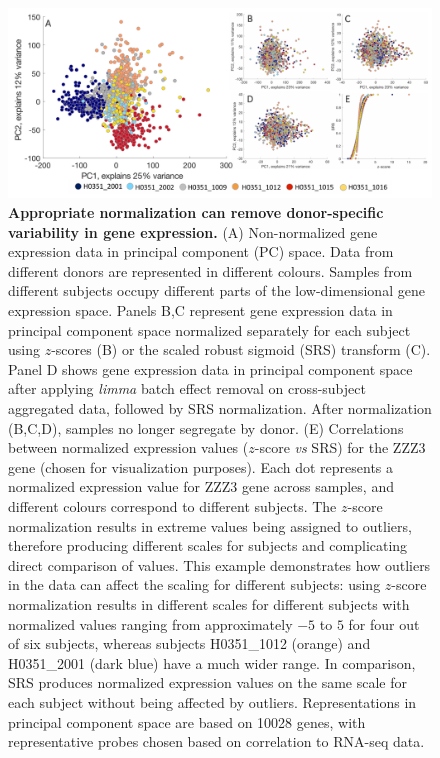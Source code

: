 \begin{figure}[h!]
  \centering
    \includegraphics[width=1\textwidth]{Chapter4/Ch4Fig6.pdf}
\caption{\textbf{Appropriate normalization can remove donor-specific variability in gene expression.}
(A) Non-normalized gene expression data in principal component (PC) space. Data from different donors are represented in different colours. Samples from different subjects occupy different parts of the low-dimensional gene expression space. Panels B,C represent gene expression data in principal component space normalized separately for each subject using $z$-scores
(B) or the scaled robust sigmoid (SRS) transform 
(C). Panel D shows gene expression data in principal component space after applying \textit{limma} batch effect removal \citep{Ritchie2015} on cross-subject aggregated data, followed by SRS normalization. After normalization (B,C,D), samples no longer segregate by donor. 
(E) Correlations between normalized expression values ($z$-score \textit{vs} SRS) for the ZZZ3 gene (chosen for visualization purposes).
Each dot represents a normalized expression value for ZZZ3 gene across samples, and different colours correspond to different subjects. The $z$-score normalization results in extreme values being assigned to outliers, therefore producing different scales for subjects and complicating direct comparison of values.
This example demonstrates how outliers in the data can affect the scaling for different subjects: using $z$-score normalization results in different scales for different subjects with normalized values ranging from approximately $-5$ to $5$ for four out of six subjects, whereas subjects H0351\_1012 (orange) and H0351\_2001 (dark blue) have a much wider range. In comparison, SRS produces normalized expression values on the same scale for each subject without being affected by outliers.
Representations in principal component space are based on \num{10028} genes, with representative probes chosen based on correlation to RNA-seq data. }
\label{fig:Ch4Fig6}
\end{figure}

